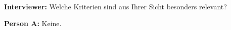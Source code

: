 
\textbf{Interviewer:} Welche Kriterien sind aus Ihrer Sicht besonders relevant?

\textbf{Person A:} Keine.